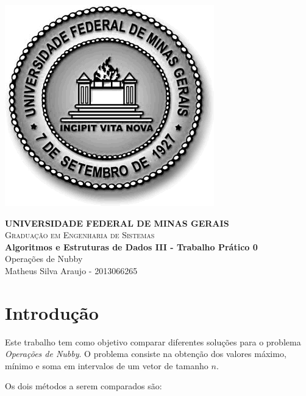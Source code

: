 \documentclass[10pt,a4paper]{article}
\begin{document}

	\begin{minipage}[b]{0.05\linewidth}
			\includegraphics[scale=0.3]{ufmg}
	\end{minipage}
	\hfill
	\begin{minipage}[b]{0.95\linewidth}
		\begin{flushright}
			\textbf{UNIVERSIDADE FEDERAL DE MINAS GERAIS} \\
			\textsc{Graduação em Engenharia de Sistemas} \\
			\textbf{Algoritmos e Estruturas de Dados III - Trabalho Prático 0} \\
			Operações de Nubby \\
			Matheus Silva Araujo - 2013066265
		\end{flushright}
	\end{minipage}

	\begin{center}
		\hrulefill
	\end{center}


	\section{Introdução}

	Este trabalho tem como objetivo comparar diferentes soluções para o problema \textit{Operações de Nubby}. O problema consiste na obtenção dos valores máximo, mínimo e soma em intervalos de um vetor de tamanho $n$.

	Os dois métodos a serem comparados são:
\end{document}
